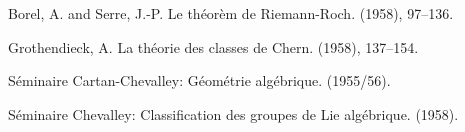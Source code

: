 \documentclass{article}
\theoremstyle{plain}
\theoremstyle{definition}
\begin{document}

\nocite{*}


\begin{thebibliography}{10}

  {\sc Borel, A. and Serre, J.-P.}
  \newblock Le th\'{e}or\`{e}m de Riemann-Roch.
   (1958), 97--136.

  {\sc Grothendieck, A.}
  \newblock La th\'{e}orie des classes de Chern.
   (1958), 137--154.

  {\sc S\'{e}minaire Cartan-Chevalley:}
  \newblock G\'{e}om\'{e}trie alg\'{e}brique.
   (1955/56).

  {\sc S\'{e}minaire Chevalley:}
  \newblock Classification des groupes de Lie alg\'{e}brique.
   (1958).

\end{thebibliography}
\end{document}

